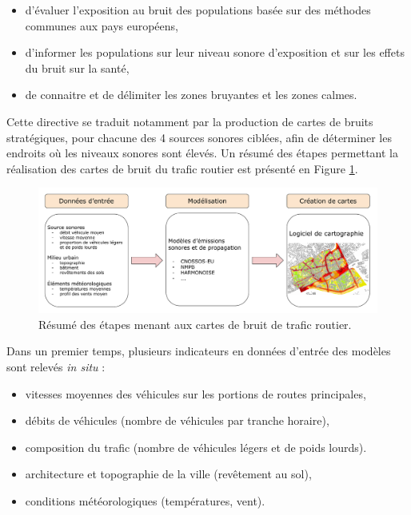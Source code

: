 \begin{itemize}
	\item d'évaluer l'exposition au bruit des populations basée sur des méthodes communes aux pays européens,
	\item d'informer les populations sur leur niveau sonore d'exposition et sur les effets du bruit sur la santé,
	\item de connaitre et de délimiter les zones bruyantes et les zones calmes.\\
\end{itemize}

Cette directive se traduit notamment par la production de cartes de bruits stratégiques, pour chacune des 4 sources sonores ciblées, afin de déterminer les endroits où les niveaux sonores sont élevés. Un résumé des étapes permettant la réalisation des cartes de bruit du trafic routier est présenté en Figure \ref{fig:cartographie}.\\


\begin{figure}[h]
\centering
\includegraphics[width=.85\linewidth]{./figures/cartographie/cartographie.pdf}
\caption{Résumé des étapes menant aux cartes de bruit de trafic routier.}
\label{fig:cartographie}
\end{figure}

Dans un premier temps, plusieurs indicateurs en données d'entrée des modèles sont relevés \textit{in situ} :

\begin{itemize}
\item vitesses moyennes des véhicules sur les portions de routes principales,
\item débits de véhicules (nombre de véhicules par tranche horaire),
\item composition du trafic (nombre de véhicules légers et de poids lourds).
\item architecture et topographie de la ville (revêtement au sol),
\item conditions météorologiques (températures, vent).\\
\end{itemize}

